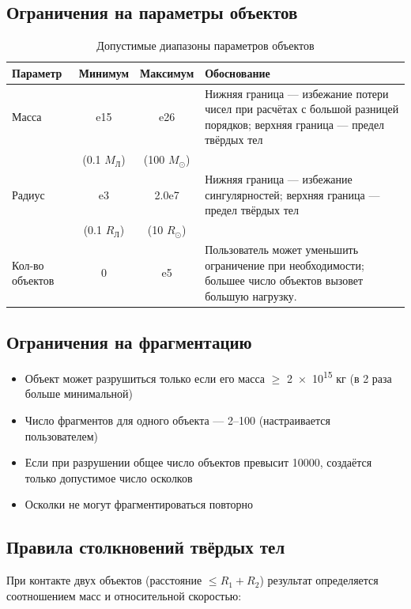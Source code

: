 \documentclass[14pt]{extarticle}
\begin{document}
	\subsection{Ограничения на параметры объектов}
	\begin{table}[H]
		\centering
		\begin{tabular}{l S[table-format=1.3e2] S[table-format=1.1e2] p{5.5cm}}
			\toprule
			Параметр & {Минимум} & {Максимум} & Обоснование \\
			\midrule
			Масса & e15 & e26 & Нижняя граница --- избежание потери чисел при расчётах с большой разницей порядков; верхняя граница --- предел твёрдых тел \\
			& {\footnotesize (\num{0.1} $M_{\text{Л}}$)} & {\footnotesize (\num{100} $M_{\odot}$)} & \\
			\midrule
			Радиус & e3 & 2.0e7 & Нижняя граница --- избежание сингулярностей; верхняя граница --- предел твёрдых тел \\
			& {\footnotesize (\num{0.1} $R_{\text{Л}}$)} & {\footnotesize (\num{10} $R_{\odot}$)} & \\
			\midrule
			Кол-во объектов & 0 & e5 & Пользователь может уменьшить ограничение при необходимости; большее число объектов вызовет большую нагрузку.\\
			\bottomrule
		\end{tabular}
		\caption{Допустимые диапазоны параметров объектов}
	\end{table}
	
	\subsection{Ограничения на фрагментацию}
	\begin{itemize}
		\item Объект может разрушиться только если его масса $\ge$ \num{2e15} кг (в 2 раза больше минимальной)
		\item Число фрагментов для одного объекта --- 2--100 (настраивается пользователем)
		\item Если при разрушении общее число объектов превысит 10000, создаётся только допустимое число осколков
		\item Осколки не могут фрагментироваться повторно
	\end{itemize}
	
	\subsection{Правила столкновений твёрдых тел}
	При контакте двух объектов (расстояние $\le R_1 + R_2$) результат определяется соотношением масс и относительной скоростью:
	
\end{document}
